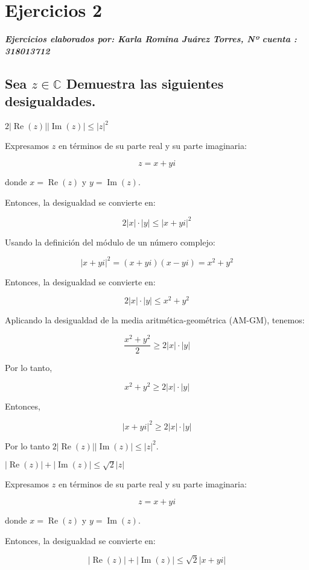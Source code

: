 \section{Ejercicios 2}
\textbf{\textit{Ejercicios elaborados por: Karla Romina Juárez Torres, Nº cuenta : 318013712}}

\subsection{Sea $z \in \mathbb{C}$ Demuestra las siguientes desigualdades.}
\textbf{$2|\operatorname{Re}(z)||\operatorname{Im}(z)|\leq |z|^2$}

Expresamos $ z $ en términos de su parte real y su parte imaginaria:

\[ z = x + yi \]

donde $ x = \operatorname{Re}(z) $ y $ y = \operatorname{Im}(z) $.

Entonces, la desigualdad se convierte en:

\[ 2|x| \cdot |y| \leq |x + yi|^2 \]

Usando la definición del módulo de un número complejo:

\[ |x + yi|^2 = (x + yi)(x - yi) = x^2 + y^2 \]

Entonces, la desigualdad se convierte en:

\[ 2|x| \cdot |y| \leq x^2 + y^2 \]

Aplicando la desigualdad de la media aritmética-geométrica (AM-GM), tenemos:

\[ \frac{x^2 + y^2}{2} \geq 2|x| \cdot |y| \]

Por lo tanto,

\[ x^2 + y^2 \geq 2|x| \cdot |y| \]

Entonces,

\[ |x + yi|^2 \geq 2|x| \cdot |y| \]

Por lo tanto $ 2|\operatorname{Re}(z)||\operatorname{Im}(z)|\leq |z|^2 $.

\textbf{$ |\operatorname{Re}(z)|+|\operatorname{Im}(z)| \leq \sqrt{2}|z|$}

Expresamos $ z $ en términos de su parte real y su parte imaginaria:

\[ z = x + yi \]

donde $ x = \operatorname{Re}(z) $ y $ y = \operatorname{Im}(z) $.

Entonces, la desigualdad se convierte en:

\[ |\operatorname{Re}(z)| + |\operatorname{Im}(z)| \leq \sqrt{2}|x + yi| \]

